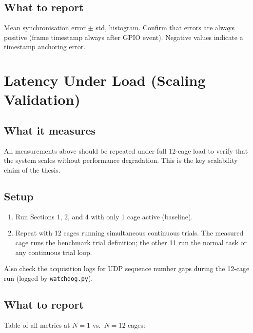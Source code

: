 \documentclass[11pt, a4paper]{article}
\begin{document}
\subsection*{What to report}

Mean synchronisation error $\pm$ std, histogram. Confirm that errors are always
positive (frame timestamp always after GPIO event). Negative values indicate a
timestamp anchoring error.

\newpage

\section{Latency Under Load (Scaling Validation)}
\label{sec:load}

\subsection*{What it measures}

All measurements above should be repeated under full 12-cage load to verify
that the system scales without performance degradation. This is the key
scalability claim of the thesis.

\subsection*{Setup}

\begin{enumerate}[noitemsep]
    \item Run Sections 1, 2, and 4 with only 1 cage active (baseline).
    \item Repeat with 12 cages running simultaneous continuous trials.
          The measured cage runs the benchmark trial definition; the other 11
          run the normal task or any continuous trial loop.
\end{enumerate}

Also check the acquisition logs for UDP sequence number gaps during the
12-cage run (logged by \texttt{watchdog.py}).

\subsection*{What to report}

Table of all metrics at $N=1$ vs.\ $N=12$ cages:
\end{document}
